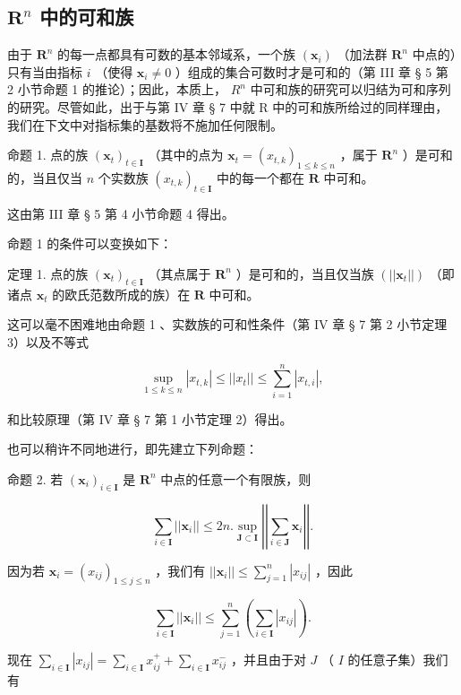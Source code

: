 \subsection{\texorpdfstring{\(\mathbf{R}^n\) 中的可和族}{R 的 n 次幂中的可和族}}

由于 \(\mathbf{R}^n\) 的每一点都具有可数的基本邻域系，一个族 \((\pmb{x}_i)\) （加法群 \(\mathbf{R}^n\) 中点的）只有当由指标 \(i\) （使得 \(\mathbf{x}_i \neq 0\) ）组成的集合可数时才是可和的（第 III 章 § 5 第 2 小节命题 1 的推论）；因此，本质上， \(R^{n}\) 中可和族的研究可以归结为可和序列的研究。尽管如此，出于与第 IV 章 § 7 中就 R 中的可和族所给过的同样理由，我们在下文中对指标集的基数将不施加任何限制。

命题 1. 点的族 \((\pmb{x}_t)_{t\in \mathbf{I}}\) （其中的点为 \(\pmb{x}_t = (x_{t,k})_{1\leq k\leq n}\) ，属于 \(\mathbf{R}^n\) ）是可和的，当且仅当 \(n\) 个实数族 \((x_{t,k})_{t\in \mathbf{I}}\) 中的每一个都在 \(\mathbf{R}\) 中可和。

这由第 III 章 § 5 第 4 小节命题 4 得出。

命题 1 的条件可以变换如下：

定理 1. 点的族 \((\pmb{x}_t)_{t\in \mathbf{I}}\) （其点属于 \(\mathbf{R}^n\) ）是可和的，当且仅当族 \((||\pmb{x}_t||)\) （即诸点 \(\pmb{x}_t\) 的欧氏范数所成的族）在 \(\mathbf{R}\) 中可和。

这可以毫不困难地由命题 1 、实数族的可和性条件（第 IV 章 § 7 第 2 小节定理 3）以及不等式

\[
\sup _ {1 \leqslant k \leqslant n} | x _ {t, k} | \leqslant | | x _ {t} | | \leqslant \sum_ {i = 1} ^ {n} | x _ {t, i} |,
\]

和比较原理（第 IV 章 § 7 第 1 小节定理 2）得出。

也可以稍许不同地进行，即先建立下列命题：

命题 2. 若 \((\pmb{x}_i)_{i\in \mathbf{I}}\) 是 \(\mathbf{R}^n\) 中点的任意一个有限族，则

\[
\sum_ {i \in \mathbf {I}} | | \boldsymbol {x} _ {i} | | \leqslant 2 n. \sup _ {\mathbf {J} \subset \mathbf {I}} \left| \left| \sum_ {i \in \mathbf {J}} \boldsymbol {x} _ {i} \right| \right|.\tag{1}
\]

因为若 \(\pmb{x}_i = (x_{ij})_{1\leqslant j\leqslant n}\) ，我们有 \(||\pmb{x}_i|| \leqslant \sum_{j=1}^{n} |x_{ij}|\) ，因此

\[
\sum_ {i \in \mathbf {I}} | | \boldsymbol {x} _ {i} | | \leqslant \sum_ {j = 1} ^ {n} \left(\sum_ {i \in \mathbf {I}} | x _ {i j} |\right).
\]

现在 \(\sum_{i\in \mathbf{I}}|x_{ij}| = \sum_{i\in \mathbf{I}}x_{ij}^{+} + \sum_{i\in \mathbf{I}}x_{ij}^{-}\) ，并且由于对 \(J\) （ \(I\) 的任意子集）我们有

